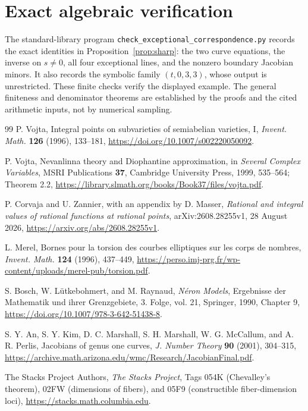 \documentclass[11pt,a4paper]{article}
\theoremstyle{definition}
\begin{document}
\section{Exact algebraic verification}

The standard-library program
\nolinkurl{check_exceptional_correspondence.py} records the exact
identities in Proposition~\ref{prop:sharp}: the two curve equations,
the inverse on $s\ne0$, all four exceptional lines, and the
nonzero boundary Jacobian minors. It also records the symbolic
family $(t,0,3,3)$, whose output is unrestricted. These finite
checks verify the displayed example. The general finiteness and
denominator theorems are established by the proofs and the cited
arithmetic inputs, not by numerical sampling.

\begin{thebibliography}{99}
P. Vojta, Integral points on subvarieties of semiabelian varieties, I,
\emph{Invent. Math.} \textbf{126} (1996), 133--181,
\url{https://doi.org/10.1007/s002220050092}.

P. Vojta, Nevanlinna theory and Diophantine approximation,
in \emph{Several Complex Variables}, MSRI Publications \textbf{37},
Cambridge University Press, 1999, 535--564; Theorem 2.2,
\url{https://library.slmath.org/books/Book37/files/vojta.pdf}.

P. Corvaja and U. Zannier, with an appendix by D. Masser,
\emph{Rational and integral values of rational functions at rational
points}, arXiv:2608.28255v1, 28 August 2026,
\url{https://arxiv.org/abs/2608.28255v1}.

L. Merel, Bornes pour la torsion des courbes elliptiques sur les
corps de nombres, \emph{Invent. Math.} \textbf{124} (1996), 437--449,
\url{https://perso.imj-prg.fr/wp-content/uploads/merel-pub/torsion.pdf}.

S. Bosch, W. L\"utkebohmert, and M. Raynaud,
\emph{N\'eron Models}, Ergebnisse der Mathematik und ihrer Grenzgebiete,
3. Folge, vol. 21, Springer, 1990, Chapter 9,
\url{https://doi.org/10.1007/978-3-642-51438-8}.

S. Y. An, S. Y. Kim, D. C. Marshall, S. H. Marshall,
W. G. McCallum, and A. R. Perlis,
Jacobians of genus one curves,
\emph{J. Number Theory} \textbf{90} (2001), 304--315,
\url{https://archive.math.arizona.edu/wmc/Research/JacobianFinal.pdf}.

The Stacks Project Authors, \emph{The Stacks Project},
Tags 054K (Chevalley's theorem), 02FW (dimensions of fibers),
and 05F9 (constructible fiber-dimension loci),
\url{https://stacks.math.columbia.edu}.
\end{thebibliography}
\end{document}
